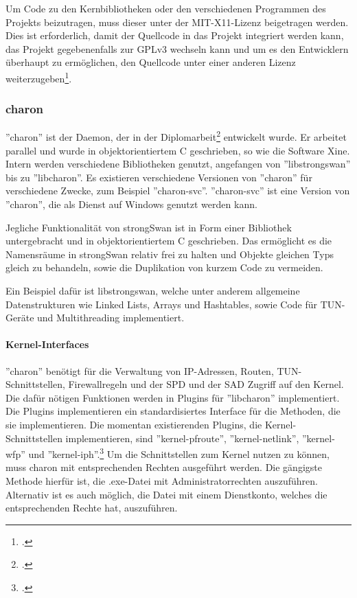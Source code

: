 Um Code zu den Kernbibliotheken oder den verschiedenen Programmen des Projekts beizutragen,
muss dieser unter der MIT-X11-Lizenz beigetragen werden.
Dies ist erforderlich, damit der Quellcode in das Projekt integriert werden kann,
das Projekt gegebenenfalls zur GPLv3 wechseln kann und um es den Entwicklern überhaupt
zu ermöglichen, den Quellcode unter einer anderen Lizenz weiterzugeben\footcite[][Contributing]{_contributions_2014}.

\subsubsection{charon}
''charon'' ist der Daemon, der in der Diplomarbeit\footcite[][]{jan_hutter_strongswan_2005} entwickelt wurde.
Er arbeitet parallel und wurde in objektorientiertem C geschrieben, so wie die Software Xine.
Intern werden verschiedene Bibliotheken genutzt, angefangen von ''libstrongswan'' bis zu ''libcharon''.
Es existieren verschiedene Versionen von ''charon'' für verschiedene Zwecke, zum Beispiel
''charon-svc''. ''charon-svc'' ist eine Version von ''charon'', die als Dienst auf Windows genutzt werden kann.

Jegliche Funktionalität von strongSwan ist in Form einer Bibliothek untergebracht und in objektorientiertem
C geschrieben. Das ermöglicht es die Namensräume in strongSwan relativ frei zu halten
und Objekte gleichen Typs gleich zu behandeln, sowie die Duplikation von kurzem Code
zu vermeiden.

Ein Beispiel dafür ist libstrongswan, welche unter anderem 
allgemeine Datenstrukturen wie Linked Lists, Arrays und Hashtables, sowie Code für TUN-Geräte und
Multithreading implementiert.

\paragraph{Kernel-Interfaces}
''charon'' benötigt für die Verwaltung von \ac{IP}-Adressen, Routen, TUN-Schnittstellen,
Firewallregeln und
der \ac{SPD} und der \ac{SAD} Zugriff auf den Kernel. Die dafür nötigen Funktionen
werden in Plugins für ''libcharon'' implementiert. Die Plugins implementieren ein
standardisiertes Interface für die Methoden, die sie implementieren.
Die momentan existierenden Plugins,
die Kernel-Schnittstellen implementieren, sind ''kernel-pfroute'', ''kernel-netlink'', ''kernel-wfp''
und ''kernel-iph''.\footcite[][]{_pluginlist_2016}
Um die Schnittstellen zum Kernel nutzen zu können, muss charon mit entsprechenden Rechten ausgeführt werden.
Die gängigste Methode hierfür ist, die .exe-Datei mit Administratorrechten auszuführen.
Alternativ ist es auch möglich, die Datei mit einem Dienstkonto, welches die entsprechenden Rechte hat,
auszuführen.

